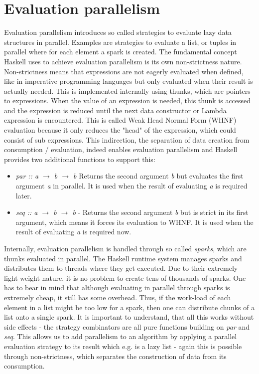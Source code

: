 \section{Evaluation parallelism}
Evaluation parallelism introduces so called strategies to evaluate lazy data structures in parallel. Examples are strategies to evaluate a list, or tuples in parallel where for each element a spark is created. The fundamental concept Haskell uses to achieve evaluation parallelism is its own non-strictness nature. Non-strictness means that expressions are not eagerly evaluated when defined, like in imperative programming languages but only evaluated when their result is actually needed. This is implemented internally using thunks, which are pointers to expressions. When the value of an expression is needed, this thunk is accessed and the expression is reduced until the next data constructor or Lambda expression is encountered. This is called Weak Head Normal Form (WHNF) evaluation because it only reduces the "head" of the expression, which could consist of sub expressions. This indirection, the separation of data creation from consumption / evaluation, indeed enables evaluation parallelism and Haskell provides two additional functions to support this:

\begin{itemize}
	\item \textit{par :: a $\rightarrow$ b $\rightarrow$ b} Returns the second argument \textit{b} but evaluates the first argument \textit{a} in parallel. It is used when the result of evaluating \textit{a} is required later.
	
	\item \textit{seq :: a $\rightarrow$ b $\rightarrow$ b} - Returns the second argument \textit{b} but is strict in its first argument, which means it forces its evaluation to WHNF. It is used when the result of evaluating \textit{a} is required now.
\end{itemize}

Internally, evaluation parallelism is handled through so called \textit{sparks}, which are thunks evaluated in parallel. The Haskell runtime system manages sparks and distributes them to threads where they get executed. Due to their extremely light-weight nature, it is no problem to create tens of thousands of sparks. One has to bear in mind that although evaluating in parallel through sparks is extremely cheap, it still has some overhead. Thus, if the work-load of each element in a list might be too low for a spark, then one can distribute chunks of a list onto a single spark.
It is important to understand, that all this works without side effects - the strategy combinators are all pure functions building on \textit{par} and \textit{seq}. This allows us to add parallelism to an algorithm by applying a parallel evaluation strategy to its result which e.g. is a lazy list - again this is possible through non-strictness, which separates the construction of data from its consumption.

